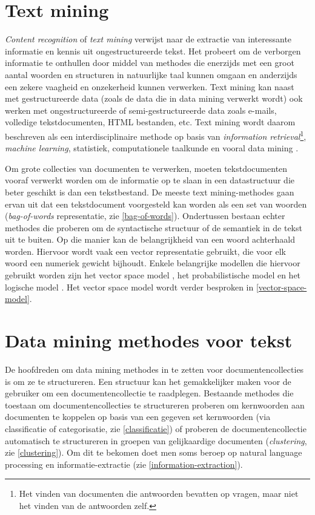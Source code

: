 \section{Text mining}\label{text-mining}
\textit{Content recognition} of \textit{text mining} verwijst naar de extractie van interessante informatie en kennis uit ongestructureerde tekst. Het probeert om de verborgen informatie te onthullen door middel van methodes die enerzijds met een groot aantal woorden en structuren in natuurlijke taal kunnen omgaan en anderzijds een zekere vaagheid en onzekerheid kunnen verwerken. Text mining kan naast met gestructureerde data (zoals de data die in data mining verwerkt wordt) ook werken met ongestructureerde of semi-gestructureerde data zoals e-mails, volledige tekstdocumenten, HTML bestanden, etc. Text mining wordt daarom beschreven als een interdisciplinaire methode op basis van \textit{information retrieval}\footnote{Het vinden van documenten die antwoorden bevatten op vragen, maar niet het vinden van de antwoorden zelf.},\textit{ machine learning}, statistiek, computationele taalkunde en vooral data mining  \cite{Hotho2005}. 

Om grote collecties van documenten te verwerken, moeten tekstdocumenten vooraf verwerkt worden om de informatie op te slaan in een datastructuur die beter geschikt is dan een tekstbestand. De meeste text mining-methodes gaan ervan uit dat een tekstdocument voorgesteld kan worden als een set van woorden (\textit{bag-of-words} representatie, zie \ref{bag-of-words}). Ondertussen bestaan echter methodes die proberen om de syntactische structuur of de semantiek in de tekst uit te buiten. Op die manier kan de belangrijkheid van een woord achterhaald worden. Hiervoor wordt vaak een vector representatie gebruikt, die voor elk woord een numeriek gewicht bijhoudt. Enkele belangrijke modellen die hiervoor gebruikt worden zijn het vector space model \cite{Salton1975}, het probabilistische model \cite{ROBERTSON1977} en het logische model \cite{Rigsbergen1986}. Het vector space model wordt verder besproken in \ref{vector-space-model}.

\section{Data mining methodes voor tekst}
De hoofdreden om data mining methodes in te zetten voor documentencollecties is om ze te structureren. Een structuur kan het gemakkelijker maken voor de gebruiker om een documentencollectie te raadplegen. Bestaande methodes die toestaan om documentencollecties te structureren proberen om kernwoorden aan documenten te koppelen op basis van een gegeven set kernwoorden (via classificatie of categorisatie, zie \ref{classificatie}) of proberen de documentencollectie automatisch te structureren in groepen van gelijkaardige documenten (\textit{clustering}, zie \ref{clustering}). Om dit te bekomen doet men soms beroep op natural language processing en informatie-extractie (zie \ref{information-extraction}).



